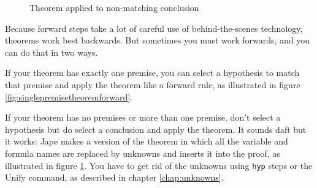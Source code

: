 \documentclass[11pt]{book}
\newcommand{\figref}[1]{figure \ref{fig:#1}}
\newcommand{\chapref}[1]{chapter \ref{chap:#1}}
\begin{document}
\begin{figure}
\centering
{}
\qquad
{}
\caption{Theorem applied to non-matching conclusion}
\label{fig:nopremisetheoremforward}
\end{figure}

Because forward steps take a lot of careful use of behind-the-scenes technology, theorems work best backwards. But sometimes you must work forwards, and you can do that in two ways.

If your theorem has exactly one premise, you can select a hypothesis to match that premise and apply the theorem like a forward rule, as illustrated in \figref{singlepremisetheoremforward}.

If your theorem has no premises or more than one premise, don't select a hypothesis but do select a conclusion and apply the theorem. It sounds daft but it works: Jape makes a version of the theorem in which all the variable and formula names are replaced by unknowns and inserts it into the proof, as illustrated in \figref{nopremisetheoremforward}. You have to get rid of the unknowns using \texttt{hyp} steps or the Unify command, as described in \chapref{unknowns}.
\end{document}
